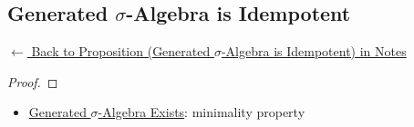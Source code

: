 
\subsection*{Generated $\sigma$-Algebra is Idempotent}
\label{prf:generated-sigma-idempotent}

\begin{remark*}[Return]
\hyperref[prop:generated-sigma-idempotent]{$\leftarrow$ Back to Proposition (Generated $\sigma$-Algebra is Idempotent) in Notes}
\end{remark*}

\begin{proof}
\end{proof}

\begin{remark*}

\end{remark*}

\begin{remark*}[Dependencies]
\begin{itemize}
  \item \hyperref[prop:generated-sigma-exists]{Generated $\sigma$-Algebra Exists}: minimality property
\end{itemize}

\end{remark*}
